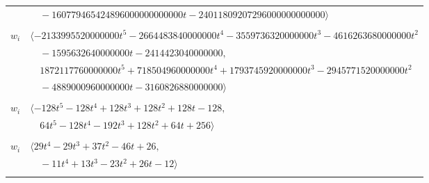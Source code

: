 \documentclass[11pt]{article}
\begin{document}
\begin{longtable}{@{}ll@{}}
 & $\quad -160779465424896000000000000t-24011809207296000000000000\rangle$\\
\addlinespace[2pt]
\multicolumn{2}{@{}p{0.97\textwidth}@{}}{$i=42$, $D_i=20000000$, $e_i=3$, $\rho_{ij}$: $4{:}1, \allowbreak 6{:}1, \allowbreak 7{:}2, \allowbreak 8{:}2, \allowbreak 19{:}2, \allowbreak 21{:}3, \allowbreak 31{:}2, \allowbreak 34{:}3, \allowbreak 37{:}3, \allowbreak 45{:}1, \allowbreak 50{:}3, \allowbreak 56{:}2, \allowbreak 64{:}2, \allowbreak 70{:}1, \allowbreak 73{:}1, \allowbreak 77{:}3$}\\
$w_i$ & $\langle -2133995520000000t^{5}-2664483840000000t^{4}-3559736320000000t^{3}-4616263680000000t^{2}$\\
 & $\quad -1595632640000000t-2414423040000000,$\\
 & $\quad 1872117760000000t^{5}+718504960000000t^{4}+1793745920000000t^{3}-2945771520000000t^{2}$\\
 & $\quad -4889000960000000t-3160826880000000\rangle$\\
\addlinespace[2pt]
\multicolumn{2}{@{}p{0.97\textwidth}@{}}{$i=43$, $D_i=16$, $e_i=0$, $\rho_{ij}$: $7{:}3, \allowbreak 20{:}1, \allowbreak 26{:}1, \allowbreak 27{:}1, \allowbreak 52{:}3, \allowbreak 78{:}3$}\\
$w_i$ & $\langle -128t^{5}-128t^{4}+128t^{3}+128t^{2}+128t-128,$\\
 & $\quad 64t^{5}-128t^{4}-192t^{3}+128t^{2}+64t+256\rangle$\\
\addlinespace[2pt]
\multicolumn{2}{@{}p{0.97\textwidth}@{}}{$i=44$, $D_i=1$, $\rho_{ij}$: $4{:}1, \allowbreak 23{:}2, \allowbreak 24{:}1, \allowbreak 26{:}3, \allowbreak 32{:}2, \allowbreak 34{:}3, \allowbreak 35{:}2, \allowbreak 38{:}1, \allowbreak 39{:}2, \allowbreak 40{:}3, \allowbreak 50{:}1, \allowbreak 55{:}3, \allowbreak 56{:}2, \allowbreak 59{:}3, \allowbreak 76{:}2$}\\
$w_i$ & $\langle 29t^{4}-29t^{3}+37t^{2}-46t+26,$\\
 & $\quad -11t^{4}+13t^{3}-23t^{2}+26t-12\rangle$\\
\addlinespace[2pt]
\multicolumn{2}{@{}p{0.97\textwidth}@{}}{$i=45$, $D_i=1$, $\rho_{ij}$: $2{:}1, \allowbreak 10{:}2, \allowbreak 11{:}3, \allowbreak 14{:}3, \allowbreak 15{:}1, \allowbreak 17{:}3, \allowbreak 21{:}2, \allowbreak 23{:}3, \allowbreak 25{:}1, \allowbreak 27{:}2, \allowbreak 29{:}2, \allowbreak 35{:}1, \allowbreak 36{:}3, \allowbreak 37{:}3, \allowbreak 41{:}1, \allowbreak 42{:}3, \allowbreak 48{:}3, \allowbreak 50{:}1, \allowbreak 51{:}2, \allowbreak 62{:}1, \allowbreak 65{:}2, \allowbreak 66{:}2, \allowbreak 76{:}1, \allowbreak 77{:}1$}\\

\end{longtable}
\end{document}
